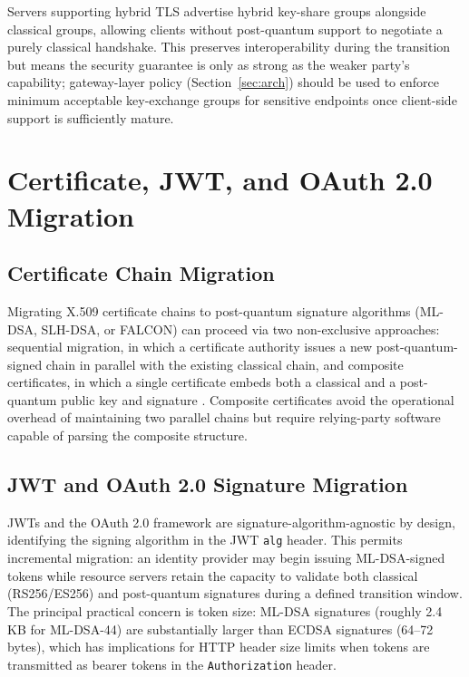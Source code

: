 \documentclass[conference]{IEEEtran}
\begin{document}
Servers supporting hybrid TLS advertise hybrid key-share groups alongside
classical groups, allowing clients without post-quantum support to
negotiate a purely classical handshake. This preserves interoperability
during the transition but means the security guarantee is only as strong
as the weaker party's capability; gateway-layer policy (Section~\ref{sec:arch})
should be used to enforce minimum acceptable key-exchange groups for
sensitive endpoints once client-side support is sufficiently mature.

\section{Certificate, JWT, and OAuth 2.0 Migration}

\subsection{Certificate Chain Migration}

Migrating X.509 certificate chains to post-quantum signature algorithms
(ML-DSA, SLH-DSA, or FALCON) can proceed via two non-exclusive approaches:
sequential migration, in which a certificate authority issues a new
post-quantum-signed chain in parallel with the existing classical chain,
and composite certificates, in which a single certificate embeds both a
classical and a post-quantum public key and signature
\cite{x509_pqc_draft}. Composite certificates avoid the operational
overhead of maintaining two parallel chains but require relying-party
software capable of parsing the composite structure.

\subsection{JWT and OAuth 2.0 Signature Migration}

JWTs \cite{rfc7519} and the OAuth 2.0 framework \cite{rfc6749} are
signature-algorithm-agnostic by design, identifying the signing algorithm
in the JWT \texttt{alg} header. This permits incremental migration: an
identity provider may begin issuing ML-DSA-signed tokens while resource
servers retain the capacity to validate both classical (RS256/ES256) and
post-quantum signatures during a defined transition window. The principal
practical concern is token size: ML-DSA signatures (roughly 2.4 KB for
ML-DSA-44) are substantially larger than ECDSA signatures (64--72 bytes),
which has implications for HTTP header size limits when tokens are
transmitted as bearer tokens in the \texttt{Authorization} header.
\end{document}
